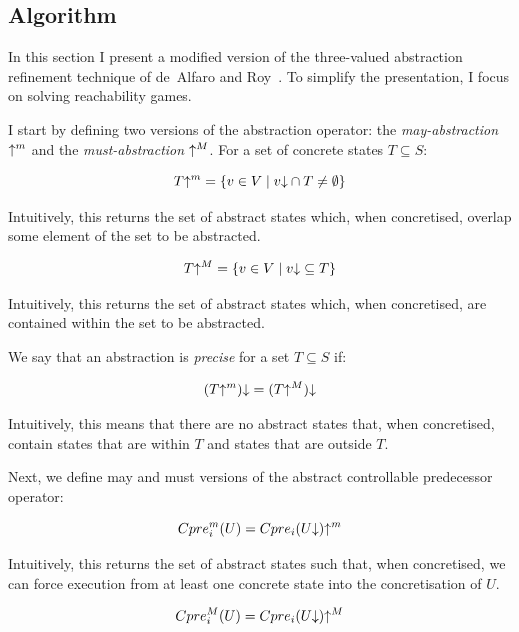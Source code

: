 \subsection{Algorithm}
\label{sec:threeval_generic}

In this section I present a modified version of the three-valued abstraction refinement technique of de~Alfaro and Roy~\cite{Alfaro_Roy_07}. To simplify the presentation, I focus on solving reachability games. 

I start by defining two versions of the abstraction operator: the \emph{may-abstraction} $\mathord{\uparrow^m}$ and the \emph{must-abstraction} $\mathord{\uparrow^M}$. For a set of concrete states $T \subseteq S$:

\begin{equation}
T\mathord{\uparrow^m} = \{v\in V\mid v\mathord{\downarrow} \cap T \neq \emptyset\} 
\end{equation}

Intuitively, this returns the set of abstract states which, when concretised, overlap some element of the set to be abstracted.

\begin{equation}
T\mathord{\uparrow^M} = \{v\in V\mid v\mathord{\downarrow} \subseteq T \}
\end{equation}

Intuitively, this returns the set of abstract states which, when concretised, are contained within the set to be abstracted.

We say that an abstraction is \emph{precise} for a set $T\subseteq S$ if:

\begin{equation}
(T\mathord{\uparrow^m})\mathord{\downarrow} = (T\mathord{\uparrow^M})\mathord{\downarrow}
\end{equation}

Intuitively, this means that there are no abstract states that, when concretised, contain states that are within $T$ and states that are outside $T$.

Next, we define may and must versions of the abstract controllable predecessor operator:

\begin{equation}
    Cpre_i^m(U) = Cpre_i(U\mathord{\downarrow})\mathord{\uparrow^m}
    \label{eqn:def_cpre_m}
\end{equation}

Intuitively, this returns the set of abstract states such that, when concretised, we can force execution from at least one concrete state into the concretisation of $U$.

\begin{equation}
    Cpre_i^M(U) = Cpre_i(U\mathord{\downarrow})\mathord{\uparrow^M}
    \label{eqn:def_cpre_M}
\end{equation}

